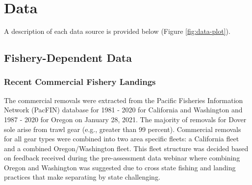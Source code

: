 \documentclass[11pt,
  english,
  a4paper,
]{article}
\begin{document}
\leavevmode\tagmcend\tagstructend\par


\hypertarget{data}{%
\section{Data}\label{data}}

\leavevmode\tagmcend\tagstructend


A description of each data source is provided below (Figure \ref{fig:data-plot}).

\leavevmode\tagmcend\tagstructend\par


\hypertarget{fishery-dependent-data}{%
\subsection{Fishery-Dependent Data}\label{fishery-dependent-data}}

\leavevmode\tagmcend\tagstructend


\hypertarget{recent-commercial-fishery-landings}{%
\subsubsection{Recent Commercial Fishery Landings}\label{recent-commercial-fishery-landings}}

\leavevmode\tagmcend\tagstructend


The commercial removals were extracted from the Pacific Fisheries Information Network (PacFIN) database for 1981 - 2020 for California and Washington and 1987 - 2020 for Oregon on January 28, 2021. The majority of removals for Dover sole arise from trawl gear (e.g., greater than 99 percent). Commercial removals for all gear types were combined into two area specific fleets: a California fleet and a combined Oregon/Washington fleet. This fleet structure was decided based on feedback received during the pre-assessment data webinar where combining Oregon and Washington was suggested due to cross state fishing and landing practices that make separating by state challenging.
\end{document}
